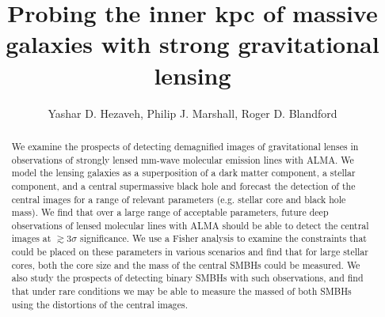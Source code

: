 \documentclass[chicago]{emulateapj}
\begin{document}
\title{Probing the inner kpc of massive galaxies with strong gravitational lensing}
\author{Yashar D. Hezaveh, Philip J. Marshall, Roger D. Blandford}  

\begin{abstract}  
\noindent
We examine the prospects of detecting demagnified images of gravitational lenses in observations of strongly lensed mm-wave molecular emission lines with ALMA. We model the lensing galaxies as a superposition of a dark matter component, a stellar component, and a central supermassive black hole and forecast the detection of the central images for a range of relevant parameters (e.g. stellar core and black hole mass).
We find that over a large range of acceptable parameters, future deep observations of lensed molecular lines with ALMA should be able to detect the central images at $\gtrsim 3\sigma$ significance. We use a Fisher analysis to examine the  constraints that could be placed on these parameters in various scenarios and find that for large stellar cores, both the core size and the mass of the central SMBHs could be measured. We also study the prospects of detecting binary SMBHs with such observations, and find that under rare conditions we may be able to measure the massed of both SMBHs using the distortions of the central images.

\end{abstract}



\end{document}
